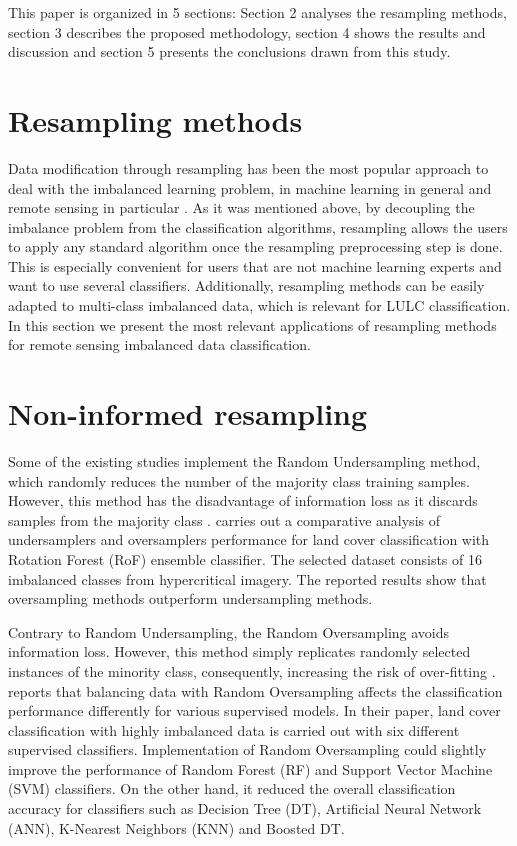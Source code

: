 \documentclass[parskip=full]{scrartcl}
\begin{document}
This paper is organized in 5 sections: Section 2 analyses the resampling methods,
section 3 describes the proposed methodology, section 4 shows the results and
discussion and section 5 presents the conclusions drawn from this study.

\section{Resampling methods}

Data modification through resampling has been the most popular approach to deal
with the imbalanced learning problem, in machine learning in general and remote
sensing in particular \cite{Feng2019}. As it was mentioned above, by decoupling
the imbalance problem from the classification algorithms, resampling allows the
users to apply any standard algorithm once the resampling preprocessing step is
done. This is especially convenient for users that are not machine learning
experts and want to use several classifiers. Additionally, resampling methods
can be easily adapted to multi-class imbalanced data, which is relevant for LULC
classification. In this section we present the most relevant applications of
resampling methods for remote sensing imbalanced data classification.

\section{Non-informed resampling}

Some of the existing studies implement the Random Undersampling method, which
randomly reduces the number of the majority class training samples.
However, this method has the disadvantage of information loss as it discards
samples from the majority class \cite{Feng2019}. \cite{Feng2018} carries out a
comparative analysis of undersamplers and oversamplers performance for land
cover classification with Rotation Forest (RoF) ensemble classifier. The
selected dataset consists of 16 imbalanced classes from hypercritical imagery.
The reported results show that oversampling methods outperform undersampling methods.

Contrary to Random Undersampling, the Random Oversampling avoids information
loss. However, this method simply replicates randomly selected instances of the
minority class, consequently, increasing the risk of over-fitting
\cite{Krawczyk2016}. \cite{Maxwell2018} reports that balancing data with Random
Oversampling affects the classification performance differently for various
supervised models. In their paper, land cover classification with highly
imbalanced data is carried out with six different supervised classifiers.
Implementation of Random Oversampling could slightly improve the performance of
Random Forest (RF) and Support Vector Machine (SVM) classifiers. On the other
hand, it reduced the overall classification accuracy for classifiers such as
Decision Tree (DT), Artificial Neural Network (ANN), K-Nearest Neighbors (KNN)
and Boosted DT.
\end{document}
